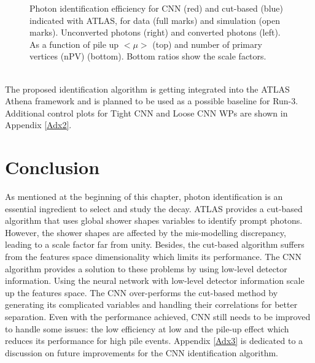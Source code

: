 \begin{figure}[htbp]
	\begin{tcolorbox}[colback=black!5!white,colframe=white!75!black]
    \caption{Photon identification efficiency for CNN (red) and cut-based (blue) indicated with ATLAS, for data (full marks) and simulation (open marks). Unconverted photons (right) and converted photons (left). As a function of pile up $<\mu>$ (top) and number of primary vertices (nPV) (bottom). Bottom ratios show the scale factors.}
    \label{fig:gamma:CNN:Zllg:MU}
    \end{tcolorbox}
\end{figure}
\\
The proposed identification algorithm is getting integrated into the ATLAS Athena framework and is planned to be used as a possible baseline for Run-3. \\
Additional control plots for Tight CNN and Loose CNN WPs are shown in Appendix \ref{Adx2}.

\section{Conclusion}
\label{gamma:conc}

As mentioned at the beginning of this chapter, photon identification is an essential ingredient to select and study the \HHyybb decay. ATLAS provides a cut-based algorithm that uses global shower shapes variables to identify prompt photons. However, the shower shapes are affected by the mis-modelling discrepancy, leading to a scale factor far from unity. Besides, the cut-based algorithm suffers from the features space dimensionality which limits its performance. The CNN algorithm provides a solution to these problems by using low-level detector information. Using the neural network with low-level detector information scale up the features space. The CNN over-performs the cut-based method by generating its complicated variables and handling their correlations for better separation. Even with the performance achieved, CNN still needs to be improved to handle some issues: the low efficiency at low \eT and the pile-up effect which reduces its performance for high pile events. Appendix \ref{Adx3} is dedicated to a discussion on future improvements for the CNN identification algorithm. 
